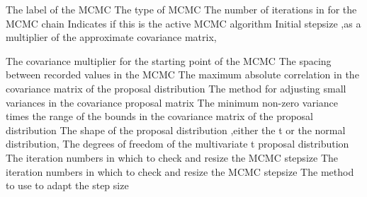 \par\textbf{}\par
\par\textbf{}\par
\par\textbf{}\par
\par\textbf{}\par
\par\textbf{}\par
\par\textbf{}\par
\par\textbf{}\par
{}\par\par
{} {The label of the MCMC}
 {The type of MCMC}
 {The number of iterations in for the MCMC chain}
 {Indicates if this is the active MCMC algorithm}
 {Initial stepsize ,as a multiplier of the approximate covariance matrix,}
\par\textbf{}\par
{} {The covariance multiplier for the starting point of the MCMC}
 {The spacing between recorded values in the MCMC}
 {The maximum absolute correlation in the covariance matrix of the proposal distribution}
 {The method for adjusting small variances in the covariance proposal matrix}
 {The minimum non-zero variance times the range of the bounds in the covariance matrix of the proposal distribution}
 {The shape of the proposal distribution ,either the t or the normal distribution,}
 {The degrees of freedom of the multivariate t proposal distribution}
 {The iteration numbers in which to check and resize the MCMC stepsize}
 {The iteration numbers in which to check and resize the MCMC stepsize}
 {The method to use to adapt the step size}

